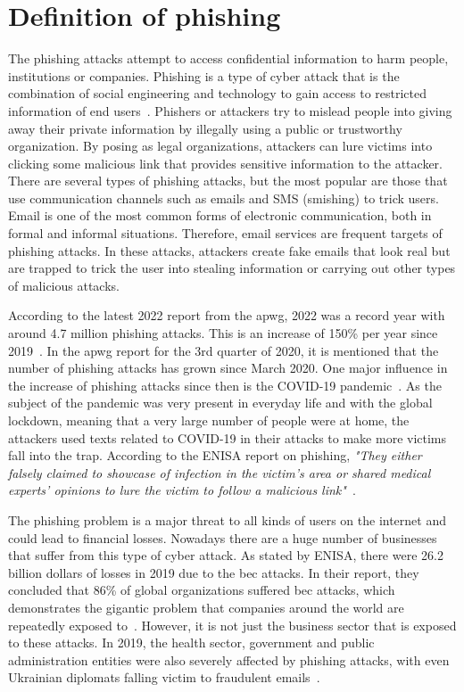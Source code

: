 \section{Definition of phishing}

The phishing attacks attempt to access confidential information to harm people, institutions or companies. Phishing is a type of cyber attack that is the combination of social engineering and technology to gain access to restricted information of end users~\cite{tandale2020different}. Phishers or attackers try to mislead people into giving away their private information by illegally using a public or trustworthy organization. By posing as legal organizations, attackers can lure victims into clicking some malicious link that provides sensitive information to the attacker. There are several types of phishing attacks, but the most popular are those that use communication channels such as emails and SMS (smishing) to trick users.
Email is one of the most common forms of electronic communication, both in formal and informal situations. Therefore, email services are frequent targets of phishing attacks. In these attacks, attackers create fake emails that look real but are trapped to trick the user into stealing information or carrying out other types of malicious attacks.

According to the latest 2022 report from the \ac{apwg}, 2022 was a record year with around 4.7 million phishing attacks. This is an increase of 150\% per year since 2019~\cite{apwg4rdquarter2022}. In the \ac{apwg} report for the 3rd quarter of 2020, it is mentioned that the number of phishing attacks has grown since March 2020. One major influence in the increase of phishing attacks since then is the COVID-19 pandemic~\cite{apwg3rdquarter2020}. As the subject of the pandemic was very present in everyday life and with the global lockdown, meaning that a very large number of people were at home, the attackers used texts related to COVID-19 in their attacks to make more victims fall into the trap. According to the ENISA report on phishing, \textit{"They either falsely claimed to showcase of infection in the victim’s area or shared medical experts’ opinions to lure the victim to follow a malicious link"}~\cite{enisa2020phishing}.


The phishing problem is a major threat to all kinds of users on the internet and could lead to financial losses. Nowadays there are a huge number of businesses that suffer from this type of cyber attack. As stated by ENISA, there were 26.2 billion dollars of losses in 2019 due to the \ac{bec} attacks. In their report, they concluded that 86\% of global organizations suffered \ac{bec} attacks, which demonstrates the gigantic problem that companies around the world are repeatedly exposed to~\cite{enisa2020phishing}. However, it is not just the business sector that is exposed to these attacks. In 2019, the health sector, government and public administration entities were also severely affected by phishing attacks, with even Ukrainian diplomats falling victim to fraudulent emails~\cite{enisa2020phishing}.


